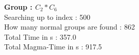 \textbf{Group : $C_2*C_6$}\\
Searching up to index : 500\\
How many normal groups are found : 862\\
Total Time in s : 357.0\\
Total Magma-Time in s : 917.5\\
